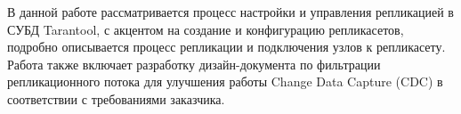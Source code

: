 \abstract

В данной работе рассматривается процесс настройки и управления репликацией в СУБД Tarantool, с акцентом на создание и конфигурацию репликасетов, подробно описывается процесс репликации и подключения узлов к репликасету. Работа также включает разработку дизайн-документа по фильтрации репликационного потока для улучшения работы Change Data Capture (CDC) в соответствии с требованиями заказчика.

